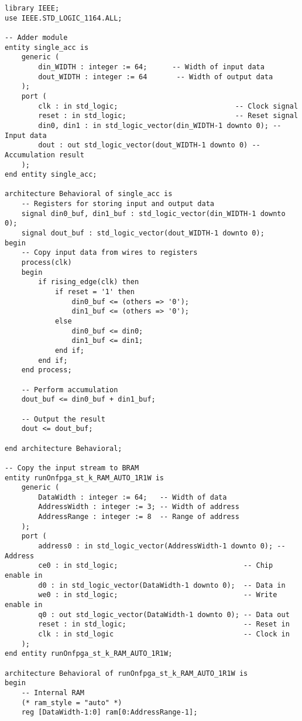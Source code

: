 \documentclass[12pt,american]{article}
\begin{document}
\begin{lstlisting}[style=vhdlStyle,caption=VHDL description of the Sequential Accumulator,label=lis:seq:RTL]
library IEEE;
use IEEE.STD_LOGIC_1164.ALL;

-- Adder module
entity single_acc is
    generic (
        din_WIDTH : integer := 64;      -- Width of input data
        dout_WIDTH : integer := 64       -- Width of output data
    );
    port (
        clk : in std_logic;                            -- Clock signal
        reset : in std_logic;                          -- Reset signal
        din0, din1 : in std_logic_vector(din_WIDTH-1 downto 0); -- Input data
        dout : out std_logic_vector(dout_WIDTH-1 downto 0) -- Accumulation result
    );
end entity single_acc;

architecture Behavioral of single_acc is
    -- Registers for storing input and output data
    signal din0_buf, din1_buf : std_logic_vector(din_WIDTH-1 downto 0);
    signal dout_buf : std_logic_vector(dout_WIDTH-1 downto 0);
begin
    -- Copy input data from wires to registers
    process(clk)
    begin
        if rising_edge(clk) then
            if reset = '1' then
                din0_buf <= (others => '0');
                din1_buf <= (others => '0');
            else
                din0_buf <= din0;
                din1_buf <= din1;
            end if;
        end if;
    end process;

    -- Perform accumulation
    dout_buf <= din0_buf + din1_buf;

    -- Output the result
    dout <= dout_buf;

end architecture Behavioral;

-- Copy the input stream to BRAM
entity runOnfpga_st_k_RAM_AUTO_1R1W is
    generic (
        DataWidth : integer := 64;   -- Width of data
        AddressWidth : integer := 3; -- Width of address
        AddressRange : integer := 8  -- Range of address
    );
    port (
        address0 : in std_logic_vector(AddressWidth-1 downto 0); -- Address
        ce0 : in std_logic;                              -- Chip enable in
        d0 : in std_logic_vector(DataWidth-1 downto 0);  -- Data in
        we0 : in std_logic;                              -- Write enable in
        q0 : out std_logic_vector(DataWidth-1 downto 0); -- Data out
        reset : in std_logic;                            -- Reset in
        clk : in std_logic                               -- Clock in
    );
end entity runOnfpga_st_k_RAM_AUTO_1R1W;

architecture Behavioral of runOnfpga_st_k_RAM_AUTO_1R1W is
begin
    -- Internal RAM
    (* ram_style = "auto" *) 
    reg [DataWidth-1:0] ram[0:AddressRange-1];


\end{lstlisting}
\end{document}
